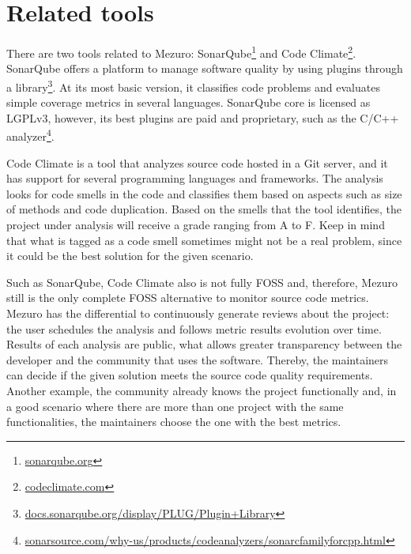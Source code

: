\section{Related tools}

There are two tools related to Mezuro: SonarQube\footnote{\url{sonarqube.org}}
and Code Climate\footnote{\url{codeclimate.com}}. SonarQube offers a platform
to manage software quality by using plugins through a
library\footnote{\url{docs.sonarqube.org/display/PLUG/Plugin+Library}}.
%
At its most basic version, it classifies code problems and evaluates simple
coverage metrics in several languages. SonarQube core is licensed as LGPLv3,
however, its best plugins are paid and proprietary, such as the C/C++
analyzer\footnote{\url{sonarsource.com/why-us/products/codeanalyzers/sonarcfamilyforcpp.html}}.

Code Climate is a tool that analyzes source code hosted in a Git server, and it
has support for several programming languages and frameworks. The analysis
looks for code smells in the code and classifies them based on aspects such as
size of methods and code duplication. Based on the smells that the tool
identifies, the project under analysis will receive a grade ranging from A to
F. Keep in mind that what is tagged as a code smell sometimes might not be a
real problem, since it could be the best solution for the given scenario.

Such as SonarQube, Code Climate also is not fully FOSS and, therefore, Mezuro
still is the only complete FOSS alternative to monitor source code metrics.
%
Mezuro has the differential to continuously generate reviews about the project:
the user schedules the analysis and follows metric results evolution over time.
Results of each analysis are public, what allows greater transparency between
the developer and the community that uses the software. Thereby, the
maintainers can decide if the given solution meets the source code quality
requirements. Another example, the community already knows the project
functionally and, in a good scenario where there are more than one project with
the same functionalities, the maintainers choose the one with the best metrics.
